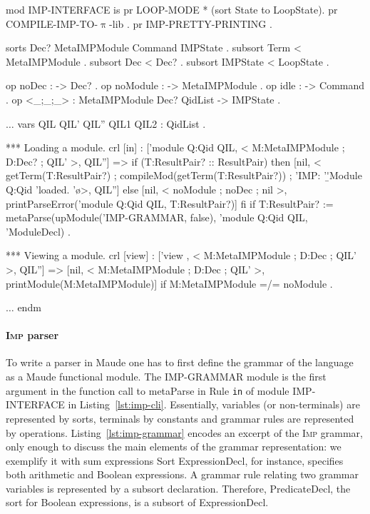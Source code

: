 \documentclass{llncs}%
\begin{document}
\begin{maude}[caption=\textsc{Imp}'s command-line interface in Maude, label=lst:imp-cli]
mod IMP-INTERFACE is
 pr LOOP-MODE * (sort State to LoopState).
 pr COMPILE-IMP-TO-$\uppi$-lib .
 pr IMP-PRETTY-PRINTING .

 sorts Dec? MetaIMPModule Command IMPState .
 subsort Term < MetaIMPModule .
 subsort Dec < Dec? .
 subsort IMPState < LoopState .

 op noDec : -> Dec? .
 op noModule : -> MetaIMPModule .
 op idle : -> Command .
 op <_;_;_> : MetaIMPModule Dec? QidList -> IMPState .

 $\ldots$
 vars QIL QIL' QIL'' QIL1 QIL2 : QidList .

 *** Loading a module.
 crl [in] : ['module Q:Qid QIL, < M:MetaIMPModule ; D:Dec? ; QIL' >, QIL''] =>
             if (T:ResultPair? :: ResultPair)
             then 
                 [nil, < getTerm(T:ResultPair?) ; 
                           compileMod(getTerm(T:ResultPair?)) ; 
                           'IMP: '\b 'Module Q:Qid 'loaded. '\o  >, QIL'']
             else [nil, < noModule ; noDec ; nil >, 
                      printParseError('module Q:Qid QIL, T:ResultPair?)]
             fi
 if T:ResultPair? :=
    metaParse(upModule('IMP-GRAMMAR, false), 
      'module Q:Qid QIL, 'ModuleDecl) .

 *** Viewing a module.
 crl [view] : ['view , < M:MetaIMPModule ; D:Dec ; QIL' >, QIL''] =>
                  [nil, < M:MetaIMPModule ; D:Dec ; QIL' >,
                           printModule(M:MetaIMPModule)]
 if M:MetaIMPModule =/= noModule .

 $\ldots$
endm
\end{maude}

\paragraph{\textsc{Imp} parser}

To write a parser in Maude one has to first define the grammar of the language as a Maude functional module. The IMP-GRAMMAR module is the first argument in the function call to metaParse in Rule \texttt{in} of module IMP-INTERFACE in Listing~\ref{lst:imp-cli}.
Essentially, variables (or non-terminals) are represented by sorts, terminals by constants and grammar rules are represented by operations. Listing~\ref{lst:imp-grammar} encodes an excerpt of the \textsc{Imp} grammar, only enough to discuss the main elements of the grammar representation: we exemplify it with sum expressions
Sort ExpressionDecl, for instance, specifies both arithmetic and Boolean expressions. A grammar rule relating two grammar variables is represented by a subsort declaration. Therefore, PredicateDecl, the sort for Boolean expressions, is a subsort of ExpressionDecl.   
\end{document}

